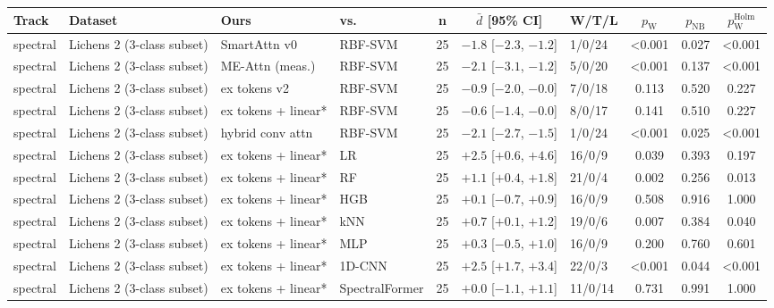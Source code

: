 \small
\begin{tabular}{llllcclccc}
\toprule
Track & Dataset & Ours & vs. & n & $\bar d$ [95\% CI] & W/T/L & $p_{\mathrm{W}}$ & $p_{\mathrm{NB}}$ & $p_{\mathrm{W}}^{\mathrm{Holm}}$ \\
\midrule
spectral & Lichens 2 (3-class subset) & SmartAttn v0 & RBF-SVM & 25 & $-1.8$ [$-2.3$, $-1.2$] & 1/0/24 & <0.001 & 0.027 & <0.001 \\
spectral & Lichens 2 (3-class subset) & ME-Attn (meas.) & RBF-SVM & 25 & $-2.1$ [$-3.1$, $-1.2$] & 5/0/20 & <0.001 & 0.137 & <0.001 \\
spectral & Lichens 2 (3-class subset) & ex tokens v2 & RBF-SVM & 25 & $-0.9$ [$-2.0$, $-0.0$] & 7/0/18 & 0.113 & 0.520 & 0.227 \\
spectral & Lichens 2 (3-class subset) & ex tokens + linear* & RBF-SVM & 25 & $-0.6$ [$-1.4$, $-0.0$] & 8/0/17 & 0.141 & 0.510 & 0.227 \\
spectral & Lichens 2 (3-class subset) & hybrid conv attn & RBF-SVM & 25 & $-2.1$ [$-2.7$, $-1.5$] & 1/0/24 & <0.001 & 0.025 & <0.001 \\
spectral & Lichens 2 (3-class subset) & ex tokens + linear* & LR & 25 & $+2.5$ [$+0.6$, $+4.6$] & 16/0/9 & 0.039 & 0.393 & 0.197 \\
spectral & Lichens 2 (3-class subset) & ex tokens + linear* & RF & 25 & $+1.1$ [$+0.4$, $+1.8$] & 21/0/4 & 0.002 & 0.256 & 0.013 \\
spectral & Lichens 2 (3-class subset) & ex tokens + linear* & HGB & 25 & $+0.1$ [$-0.7$, $+0.9$] & 16/0/9 & 0.508 & 0.916 & 1.000 \\
spectral & Lichens 2 (3-class subset) & ex tokens + linear* & kNN & 25 & $+0.7$ [$+0.1$, $+1.2$] & 19/0/6 & 0.007 & 0.384 & 0.040 \\
spectral & Lichens 2 (3-class subset) & ex tokens + linear* & MLP & 25 & $+0.3$ [$-0.5$, $+1.0$] & 16/0/9 & 0.200 & 0.760 & 0.601 \\
spectral & Lichens 2 (3-class subset) & ex tokens + linear* & 1D-CNN & 25 & $+2.5$ [$+1.7$, $+3.4$] & 22/0/3 & <0.001 & 0.044 & <0.001 \\
spectral & Lichens 2 (3-class subset) & ex tokens + linear* & SpectralFormer & 25 & $+0.0$ [$-1.1$, $+1.1$] & 11/0/14 & 0.731 & 0.991 & 1.000 \\
\bottomrule
\end{tabular}
